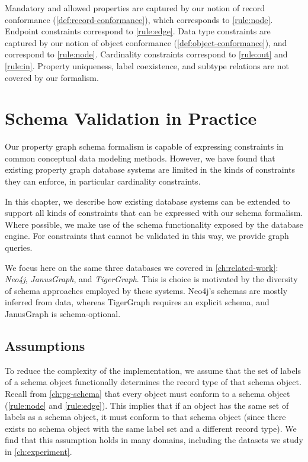 \documentclass{report}
\theoremstyle{definition}
\begin{document}
Mandatory and allowed properties are captured by our notion of record conformance (\autoref{def:record-conformance}), which corresponds to \autoref{rule:node}. Endpoint constraints correspond to \autoref{rule:edge}. Data type constraints are captured by our notion of object conformance (\autoref{def:object-conformance}), and correspond to \autoref{rule:node}. Cardinality constraints correspond to \autoref{rule:out} and \ref{rule:in}. Property uniqueness, label coexistence, and subtype relations are not covered by our formalism.

\chapter{Schema Validation in Practice}
\label{ch:practice}

Our property graph schema formalism is capable of expressing constraints in common conceptual data modeling methods. However, we have found that existing property graph database systems are limited in the kinds of constraints they can enforce, in particular cardinality constraints.

In this chapter, we describe how existing database systems can be extended to support all kinds of constraints that can be expressed with our schema formalism. Where possible, we make use of the schema functionality exposed by the database engine. For constraints that cannot be validated in this way, we provide graph queries.

We focus here on the same three databases we covered in \autoref{ch:related-work}: \emph{Neo4j}, \emph{JanusGraph}, and \emph{TigerGraph}. This is choice is motivated by the diversity of schema approaches employed by these systems. Neo4j's schemas are mostly inferred from data, whereas TigerGraph requires an explicit schema, and JanusGraph is schema-optional.

\section{Assumptions}

To reduce the complexity of the implementation, we assume that the set of labels of a schema object functionally determines the record type of that schema object. Recall from \autoref{ch:pg-schema} that every object must conform to a schema object (\autoref{rule:node} and \ref{rule:edge}). This implies that if an object has the same set of labels as a schema object, it must conform to that schema object (since there exists no schema object with the same label set and a different record type). We find that this assumption holds in many domains, including the datasets we study in \autoref{ch:experiment}.
\end{document}
